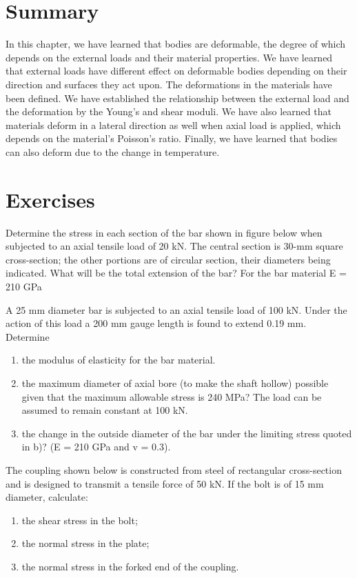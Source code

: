 \documentclass[
10pt,
a4paper,
openany,
svgnames,
]{book} %
\newcommand{\exercise}{%
\item\label{lab:\arabic{chapter}.\arabic{exercisesi}}  %
}
\begin{document}
\section*{Summary}

In this chapter, we have learned that bodies are deformable, the degree of which depends on the external loads and their material properties. We have learned that external loads have different effect on deformable bodies depending on their direction and surfaces they act upon. The deformations in the materials have been defined. We have established the relationship between the external load and the deformation by the Young’s and shear moduli. We have also learned that materials deform in a lateral direction as well when axial load is applied, which depends on the material’s Poisson’s ratio. Finally, we have learned that bodies can also deform due to the change in temperature.

\section*{Exercises}

\begin{exercises}

  \exercise Determine the stress in each section of the bar shown in figure below when subjected to an axial tensile load of 20 kN. The central section is 30-mm square cross-section; the other portions are of circular section, their diameters being indicated. What will be the total extension of the bar? For the bar material E = 210 GPa
  
  \exercise A 25 mm diameter bar is subjected to an axial tensile load of 100 kN. Under the action of this load a 200 mm gauge length is found to extend 0.19 mm. Determine
  \begin{enumerate}
  \item the modulus of elasticity for the bar material.
  \item the maximum diameter of axial bore (to make the shaft hollow) possible given that the maximum allowable stress is 240 MPa? The load can be assumed to remain constant at 100 kN.
  \item the change in the outside diameter of the bar under the limiting stress quoted in b)? (E = 210 GPa and v = 0.3).
  \end{enumerate} 

  \exercise The coupling shown below is constructed from steel of rectangular cross-section and is designed to transmit a tensile force of 50 kN. If the bolt is of 15 mm diameter, calculate:
  \begin{enumerate}
  \item the shear stress in the bolt;
  \item the normal stress in the plate;
  \item the normal stress in the forked end of the coupling.
  \end{enumerate}
\end{exercises}
\end{document}
